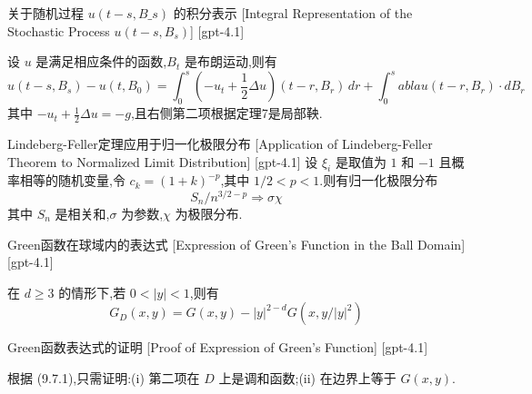 \documentclass[UTF8]{ctexart}
\begin{document}
    
    
    \begin{thm}
        {关于随机过程 $u(t-s, B\_s)$ 的积分表示}
        [Integral Representation of the Stochastic Process $u(t-s, B_s)$]
        [gpt-4.1]
        
设 $u$ 是满足相应条件的函数,$B_t$ 是布朗运动,则有
\[
u(t-s, B_{s}) - u(t, B_{0}) = \int_{0}^{s} \left(-u_{t} + \frac{1}{2} \Delta u\right)(t-r, B_{r})\, dr 
+ \int_{0}^{s} 
abla u(t-r, B_{r}) \cdot dB_{r}
\]
其中 $-u_{t} + \frac{1}{2} \Delta u = -g$,且右侧第二项根据定理7是局部鞅.

    \end{thm}
    
    
    
    \begin{thm}
        {Lindeberg-Feller定理应用于归一化极限分布}
        [Application of Lindeberg-Feller Theorem to Normalized Limit Distribution]
        [gpt-4.1]
        设 $\xi_{i}$ 是取值为 $1$ 和 $-1$ 且概率相等的随机变量,令 $c_{k} = (1 + k)^{-p}$,其中 $1/2 < p < 1$.则有归一化极限分布
\[
S_{n} / n^{3/2 - p} \Rightarrow \sigma \chi
\]
其中 $S_n$ 是相关和,$\sigma$ 为参数,$\chi$ 为极限分布.
    \end{thm}
    
    
    
    \begin{thm}
        {Green函数在球域内的表达式}
        [Expression of Green's Function in the Ball Domain]
        [gpt-4.1]
        
在 $d \geq 3$ 的情形下,若 $0 < |y| < 1$,则有
\[
G_D(x, y) = G(x, y) - |y|^{2-d} G(x, y / |y|^2)
\]

    \end{thm}
    
    
    
    \begin{prf}
        {Green函数表达式的证明}
        [Proof of Expression of Green's Function]
        [gpt-4.1]
        
根据 (9.7.1),只需证明:(i) 第二项在 $D$ 上是调和函数;(ii) 在边界上等于 $G(x, y)$.

    \end{prf}
    
    
    
\end{document}
